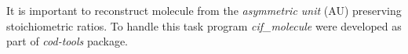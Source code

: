 It is important to reconstruct molecule from the \textit{asymmetric unit} (AU) preserving stoichiometric ratios. To handle this task program \textit{cif\_molecule}\cite{Grazulis2015} were developed as part of \textit{cod-tools} package.

